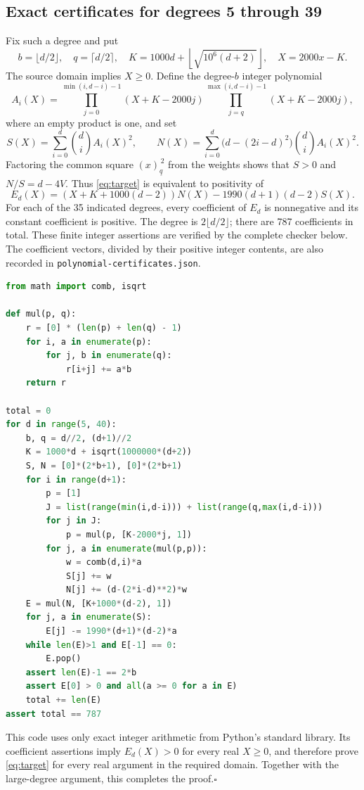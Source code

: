 \documentclass[11pt]{article}
\begin{document}
\subsection*{Exact certificates for degrees 5 through 39}
Fix such a degree and put
\[
 b=\lfloor d/2\rfloor,\quad q=\lceil d/2\rceil,\quad
 K=1000d+\left\lfloor\sqrt{10^6(d+2)}\right\rfloor,
 \quad X=2000x-K.
\]
The source domain implies $X\ge0$. Define the degree-$b$ integer
polynomial
\[
 A_i(X)=
 \prod_{j=0}^{\min(i,d-i)-1}(X+K-2000j)
 \prod_{j=q}^{\max(i,d-i)-1}(X+K-2000j),
\]
where an empty product is one, and set
\[
 S(X)=\sum_{i=0}^d\binom di A_i(X)^2,\qquad
 N(X)=\sum_{i=0}^d\bigl(d-(2i-d)^2\bigr)\binom di A_i(X)^2.
\]
Factoring the common square $(x)_{\underline q}^{\,2}$ from the
weights shows that $S>0$ and $N/S=d-4V$. Thus
\eqref{eq:target} is equivalent to positivity of
\begin{equation}\label{eq:smallcert}
 E_d(X)=(X+K+1000(d-2))N(X)-1990(d+1)(d-2)S(X).
\end{equation}
For each of the 35 indicated degrees, every coefficient of $E_d$ is
nonnegative and its constant coefficient is positive. The degree is
$2\lfloor d/2\rfloor$; there are 787 coefficients in total.
These finite integer assertions are verified by the complete checker
below. The coefficient vectors, divided by their positive integer
contents, are also recorded in \texttt{polynomial-certificates.json}.

\begin{lstlisting}[language=Python]
from math import comb, isqrt

def mul(p, q):
    r = [0] * (len(p) + len(q) - 1)
    for i, a in enumerate(p):
        for j, b in enumerate(q):
            r[i+j] += a*b
    return r

total = 0
for d in range(5, 40):
    b, q = d//2, (d+1)//2
    K = 1000*d + isqrt(1000000*(d+2))
    S, N = [0]*(2*b+1), [0]*(2*b+1)
    for i in range(d+1):
        p = [1]
        J = list(range(min(i,d-i))) + list(range(q,max(i,d-i)))
        for j in J:
            p = mul(p, [K-2000*j, 1])
        for j, a in enumerate(mul(p,p)):
            w = comb(d,i)*a
            S[j] += w
            N[j] += (d-(2*i-d)**2)*w
    E = mul(N, [K+1000*(d-2), 1])
    for j, a in enumerate(S):
        E[j] -= 1990*(d+1)*(d-2)*a
    while len(E)>1 and E[-1] == 0:
        E.pop()
    assert len(E)-1 == 2*b
    assert E[0] > 0 and all(a >= 0 for a in E)
    total += len(E)
assert total == 787
\end{lstlisting}
This code uses only exact integer arithmetic from Python's standard
library. Its coefficient assertions imply $E_d(X)>0$ for every real
$X\ge0$, and therefore prove \eqref{eq:target} for every real argument
in the required domain. Together with the large-degree argument,
this completes the proof.\hfill$\square$
\end{document}
